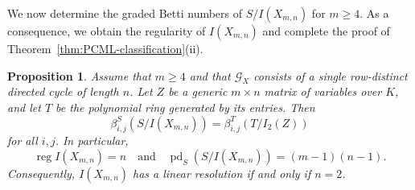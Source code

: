 \documentclass[12pt]{amsart}
\numberwithin{equation}{section}
\newtheorem{Proposition}[Theorem]{Proposition}
\begin{document}
We now determine the graded Betti numbers of
$S/I(X_{m,n})$ for $m\geq 4$. As a consequence,
we obtain the regularity of $I(X_{m,n})$ and
complete the proof of Theorem~\ref{thm:PCML-classification}(ii).

\begin{Proposition}\label{prop:regularity}
Assume that $m\geq 4$ and that $\mathcal G_X$ consists of a
single row-distinct directed cycle of length $n$.
Let $Z$ be a generic $m\times n$ matrix of variables
over $K$, and let $T$ be the polynomial ring generated
by its entries. Then
\[
\beta_{i,j}^{S}(S/I(X_{m,n}))
=
\beta_{i,j}^{T}(T/I_2(Z))
\]
for all $i,j$. In particular,
\[
\operatorname{reg} I(X_{m,n})=n
\quad\text{and}\quad
\operatorname{pd}_S(S/I(X_{m,n}))=(m-1)(n-1).
\]
Consequently, $I(X_{m,n})$ has a linear resolution if and only if $n=2$.
\end{Proposition}
\end{document}
